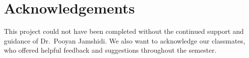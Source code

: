 \documentclass{article}
\begin{document}
\section{Acknowledgements}
This project could not have been completed without the continued support and guidance of Dr.\ Pooyan Jamshidi. We also want to acknowledge our classmates, who offered helpful feedback and suggestions throughout the semester.

\nocite{gessert20}



\end{document}
